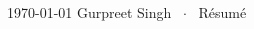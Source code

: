\documentclass[11pt, a4paper]{resume}
\begin{document}
\makecvheader[C]

\makecvfooter
  {\today}
  {Gurpreet Singh \ $\cdot$ \ Résumé}
  {\thepage}

\setlength\columnsep{7mm}

\begin{multicols}{2}
	
	
	
	
	
	
\end{multicols}

\vspace{-0.7cm}


\end{document}
